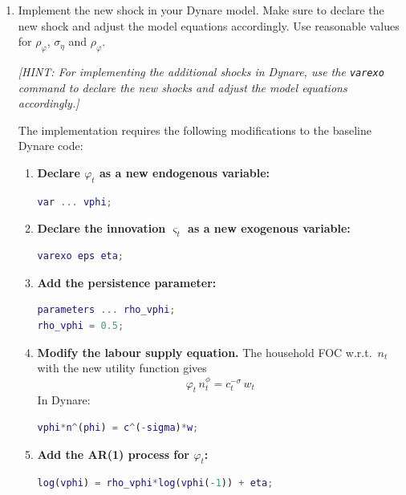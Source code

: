 \documentclass[dvipsnames,11pt]{article}
\begin{document}
        \begin{enumerate}
            \item[5.] Implement the new shock in your Dynare model. Make sure to declare the new shock and adjust the model equations accordingly. Use reasonable values for \( \rho_\varphi \), \( \sigma_\eta \) and \( \rho_\varphi \).
        
            \textit{[HINT: For implementing the additional shocks in Dynare, use the \texttt{varexo} command to declare the new shocks and adjust the model equations accordingly.]}

                \begin{solution}

                    The implementation requires the following modifications to the baseline Dynare code:
                    
                    \begin{enumerate}
                        \item[(a)] \textbf{Declare $\varphi_t$ as a new endogenous variable:}
\begin{lstlisting}[language=matlab]
var ... vphi;
\end{lstlisting}
                    
                        \item[(b)] \textbf{Declare the innovation $\varsigma_t$ as a new exogenous variable:}
\begin{lstlisting}[language=matlab]
varexo eps eta;
\end{lstlisting}
                    
                        \item[(c)] \textbf{Add the persistence parameter:}
\begin{lstlisting}[language=matlab]
parameters ... rho_vphi;
rho_vphi = 0.5;
\end{lstlisting}
                    
                        \item[(d)] \textbf{Modify the labour supply equation.} The household FOC w.r.t.\ $n_t$ with the new utility function gives
                        \[
                        \varphi_t\,n_t^{\phi} = c_t^{-\sigma}\,w_t
                        \]
                        In Dynare:
\begin{lstlisting}[language=matlab]
vphi*n^(phi) = c^(-sigma)*w;
\end{lstlisting}
                    
                        \item[(e)] \textbf{Add the AR(1) process for $\varphi_t$:}
\begin{lstlisting}[language=matlab]
log(vphi) = rho_vphi*log(vphi(-1)) + eta;
\end{lstlisting}
                    

\end{enumerate}
\end{solution}
\end{enumerate}
\end{document}
